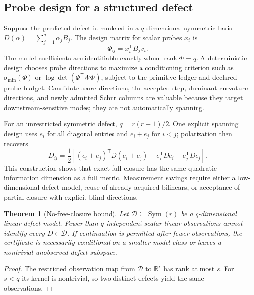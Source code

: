\documentclass[10pt,twocolumn]{article}
\newtheorem{theorem}{Theorem}[section]
\theoremstyle{definition}
\theoremstyle{remark}
\newcommand{\R}{\mathbb R}
\newcommand{\rank}{\operatorname{rank}}
\begin{document}
\subsection{Probe design for a structured defect}

Suppose the predicted defect is modeled in a $q$-dimensional symmetric basis
$D(\alpha)=\sum_{j=1}^q\alpha_jB_j$.  The design matrix for scalar probes
$x_i$ is
\begin{equation}
 \Phi_{ij}=x_i^{\mathsf T}B_jx_i .
 \label{eq:appdesign}
\end{equation}
The model coefficients are identifiable exactly when $\rank\Phi=q$.  A
deterministic design chooses probe directions to maximize a conditioning
criterion such as $\sigma_{\min}(\Phi)$ or
$\log\det(\Phi^{\mathsf T}W\Phi)$, subject to the primitive ledger and
declared probe budget.  Candidate-score directions, the accepted step,
dominant curvature directions, and newly admitted Schur columns are valuable
because they target downstream-sensitive modes; they are not automatically
spanning.

For an unrestricted symmetric defect, $q=r(r+1)/2$.  One explicit spanning
design uses $e_i$ for all diagonal entries and $e_i+e_j$ for $i<j$; polarization
then recovers
\begin{equation}
 D_{ij}=\frac12\left[
 (e_i+e_j)^{\mathsf T}D(e_i+e_j)
 -e_i^{\mathsf T}De_i-e_j^{\mathsf T}De_j\right].
 \label{eq:apppolarization}
\end{equation}
This construction shows that exact full closure has the same quadratic
information dimension as a full metric.  Measurement savings require either
a low-dimensional defect model, reuse of already acquired bilinears, or
acceptance of partial closure with explicit blind directions.

\begin{theorem}[No-free-closure bound]
\label{thm:nofreeclosure}
Let $\mathcal D\subseteq\operatorname{Sym}(r)$ be a $q$-dimensional linear
defect model.  Fewer than $q$ independent scalar linear observations cannot
identify every $D\in\mathcal D$.  If continuation is permitted after fewer
observations, the certificate is necessarily conditional on a smaller model
class or leaves a nontrivial unobserved defect subspace.
\end{theorem}
\begin{proof}
The restricted observation map from $\mathcal D$ to $\R^s$ has rank at most
$s$.  For $s<q$ its kernel is nontrivial, so two distinct defects yield the
same observations.
\end{proof}
\end{document}
